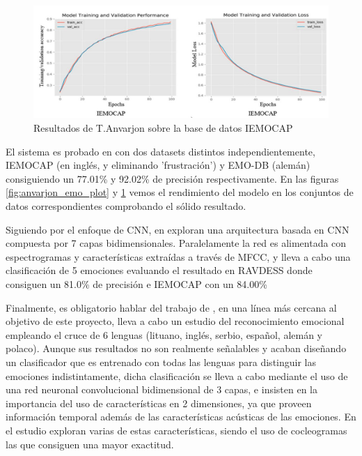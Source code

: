 \documentclass[11pt,a4paper,spanish]{book}
\begin{document}
	\begin{figure}[H]
		\centering
		\includegraphics[scale=0.35]{anvarjon2020_imeocap.JPG} 
		\caption{Resultados de T.Anvarjon sobre la base de datos IEMOCAP}
		\label{fig:anvarjon_ime_plot}
	\end{figure}

	El sistema es probado en con dos datasets distintos independientemente, IEMOCAP (en inglés, y eliminando 'frustración') y EMO-DB (alemán) consiguiendo un 77.01\% y 92.02\%  de precisión respectivamente. En las figuras \ref{fig:anvarjon_emo_plot} y \ref{fig:anvarjon_ime_plot} vemos el rendimiento del modelo en los conjuntos de datos correspondientes comprobando el sólido resultado.
	
	

	
	 Siguiendo por el enfoque de CNN, en \cite{Mustaqeem2020} exploran una arquitectura basada en CNN compuesta por 7 capas bidimensionales. Paralelamente la red es alimentada con espectrogramas y características extraídas a través de MFCC, y lleva a cabo una clasificación de 5 emociones evaluando el resultado en RAVDESS donde consiguen un 81.0\% de precisión e IEMOCAP con un 84.00\%
	 
	 Finalmente, es obligatorio hablar del trabajo de \cite{Tamulevicius2020}, en una línea más cercana al objetivo de este proyecto, lleva a cabo un estudio del reconocimiento emocional empleando el cruce de 6 lenguas (lituano, inglés, serbio, español, alemán y polaco). Aunque sus resultados no son realmente señalables y acaban diseñando un clasificador que es entrenado con todas las lenguas para distinguir las emociones indistintamente, dicha clasificación se lleva a cabo mediante el uso de una red neuronal convolucional bidimensional de 3 capas, e insisten en la importancia del uso de características en 2 dimensiones, ya que proveen información temporal además de las características acústicas de las emociones. En el estudio exploran varias de estas características, siendo el uso de cocleogramas las que consiguen una mayor exactitud.
	 
\end{document}
